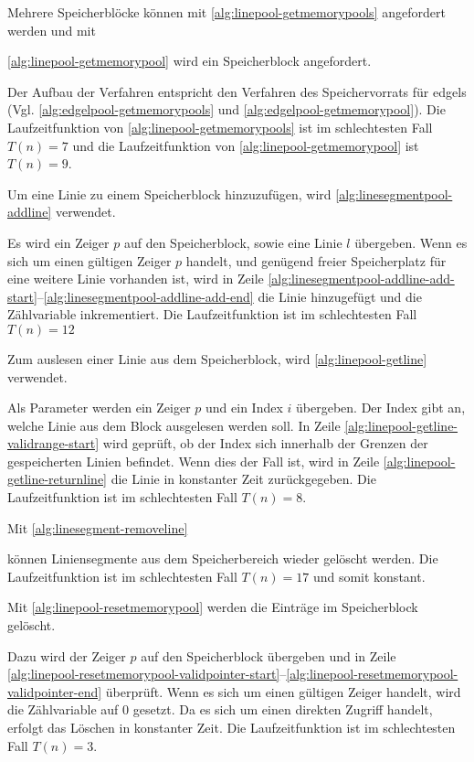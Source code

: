 Mehrere Speicherblöcke können mit \autoref{alg:linepool-getmemorypools} angefordert werden und mit

 \autoref{alg:linepool-getmemorypool} wird ein Speicherblock angefordert.

Der Aufbau der Verfahren entspricht den Verfahren des Speichervorrats für \glspl{edgel}
 (Vgl. \autoref{alg:edgelpool-getmemorypools} und \autoref{alg:edgelpool-getmemorypool}).
Die Laufzeitfunktion von \autoref{alg:linepool-getmemorypools} ist im schlechtesten Fall $T(n) = 7$ und die
 Laufzeitfunktion von \autoref{alg:linepool-getmemorypool} ist $T(n) = 9$.

Um eine Linie zu einem Speicherblock hinzuzufügen, wird \autoref{alg:linesegmentpool-addline} verwendet.

Es wird ein Zeiger $p$ auf den Speicherblock, sowie eine Linie $l$ übergeben. Wenn es sich um einen gültigen Zeiger $p$
 handelt, und genügend freier Speicherplatz für eine weitere Linie vorhanden ist, wird in Zeile
 \ref{alg:linesegmentpool-addline-add-start}--\ref{alg:linesegmentpool-addline-add-end} die Linie hinzugefügt und die
 Zählvariable inkrementiert. Die Laufzeitfunktion ist im schlechtesten Fall $T(n) = 12$

Zum auslesen einer Linie aus dem Speicherblock, wird \autoref{alg:linepool-getline} verwendet.

Als Parameter werden ein Zeiger $p$ und ein Index $i$ übergeben. Der Index gibt an, welche Linie aus dem Block
 ausgelesen werden soll. In Zeile \ref{alg:linepool-getline-validrange-start} wird geprüft, ob der Index sich innerhalb
 der Grenzen der gespeicherten Linien befindet. Wenn dies der Fall ist, wird in Zeile
 \ref{alg:linepool-getline-returnline} die Linie in konstanter Zeit zurückgegeben. Die Laufzeitfunktion ist im schlechtesten Fall $T(n) = 8$.

Mit \autoref{alg:linesegment-removeline}

können Liniensegmente aus dem Speicherbereich wieder gelöscht werden. Die Laufzeitfunktion ist im schlechtesten Fall
 $T(n) = 17$ und somit konstant.

Mit \autoref{alg:linepool-resetmemorypool} werden die Einträge im Speicherblock gelöscht.

Dazu wird der Zeiger $p$ auf den Speicherblock übergeben und in Zeile
 \ref{alg:linepool-resetmemorypool-validpointer-start}--\ref{alg:linepool-resetmemorypool-validpointer-end} überprüft.
 Wenn es sich um einen gültigen Zeiger handelt, wird die Zählvariable auf $0$ gesetzt. Da es sich um einen direkten
 Zugriff handelt, erfolgt das Löschen in konstanter Zeit. Die Laufzeitfunktion ist im schlechtesten Fall $T(n) = 3$.

